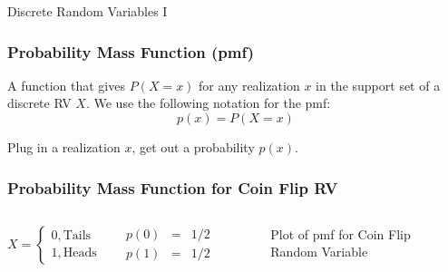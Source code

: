 \documentclass[handout]{beamer}
\begin{document}
\begin{frame}

\centering \Huge Discrete Random Variables I

\end{frame}
\begin{frame}
\frametitle{Probability Mass Function (pmf)}
 A function that gives $P(X=x)$ for any realization $x$ in the support set of a discrete RV $X$. We use the following notation for the pmf:
 $$p(x) = P(X =x)$$

 

\begin{alertblock}{Plug in a realization $x$, get out a probability  $p(x)$.}\end{alertblock}

 


\end{frame}
\begin{frame}
\frametitle{Probability Mass Function for Coin Flip RV}

\begin{columns}
$$X = \left\{ \begin{array}{l}  0, \mbox{Tails}\\ 1, \mbox{Heads}\end{array} \right.$$

\begin{eqnarray*}
	p(0) &=& 1/2\\
	p(1) &=& 1/2
\end{eqnarray*}


\begin{figure}
\centering
{}
\caption{Plot of pmf for Coin Flip Random Variable}
\end{figure}
\end{columns}


\end{frame}
\end{document}
